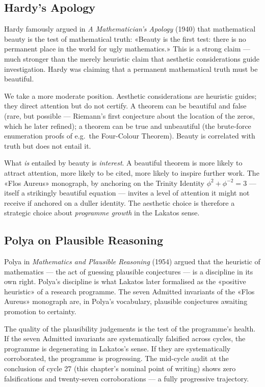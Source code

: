 \subsection{Hardy's Apology}
\label{sec:31-hardy-apology}

Hardy famously argued in \emph{A Mathematician's Apology} (1940) that mathematical beauty is the test of mathematical truth: «Beauty is the first test: there is no permanent place in the world for ugly mathematics.» This is a strong claim — much stronger than the merely heuristic claim that aesthetic considerations guide investigation. Hardy was claiming that a permanent mathematical truth must be beautiful.

We take a more moderate position. Aesthetic considerations are heuristic guides; they direct attention but do not certify. A theorem can be beautiful and false (rare, but possible — Riemann's first conjecture about the location of the zeros, which he later refined); a theorem can be true and unbeautiful (the brute-force enumeration proofs of e.g.\ the Four-Colour Theorem). Beauty is correlated with truth but does not entail it.

What \emph{is} entailed by beauty is \emph{interest}. A beautiful theorem is more likely to attract attention, more likely to be cited, more likely to inspire further work. The «Flos Aureus» monograph, by anchoring on the Trinity Identity $\phi^{2} + \phi^{-2} = 3$ — itself a strikingly beautiful equation — invites a level of attention it might not receive if anchored on a duller identity. The aesthetic choice is therefore a strategic choice about \emph{programme growth} in the Lakatos sense.

\subsection{Polya on Plausible Reasoning}
\label{sec:31-polya}

Polya in \emph{Mathematics and Plausible Reasoning} (1954) argued that the heuristic of mathematics — the act of guessing plausible conjectures — is a discipline in its own right. Polya's discipline is what Lakatos later formalised as the «positive heuristic» of a research programme. The seven Admitted invariants of the «Flos Aureus» monograph are, in Polya's vocabulary, plausible conjectures awaiting promotion to certainty.

The quality of the plausibility judgements is the test of the programme's health. If the seven Admitted invariants are systematically falsified across cycles, the programme is degenerating in Lakatos's sense. If they are systematically corroborated, the programme is progressing. The mid-cycle audit at the conclusion of cycle 27 (this chapter's nominal point of writing) shows zero falsifications and twenty-seven corroborations — a fully progressive trajectory.

